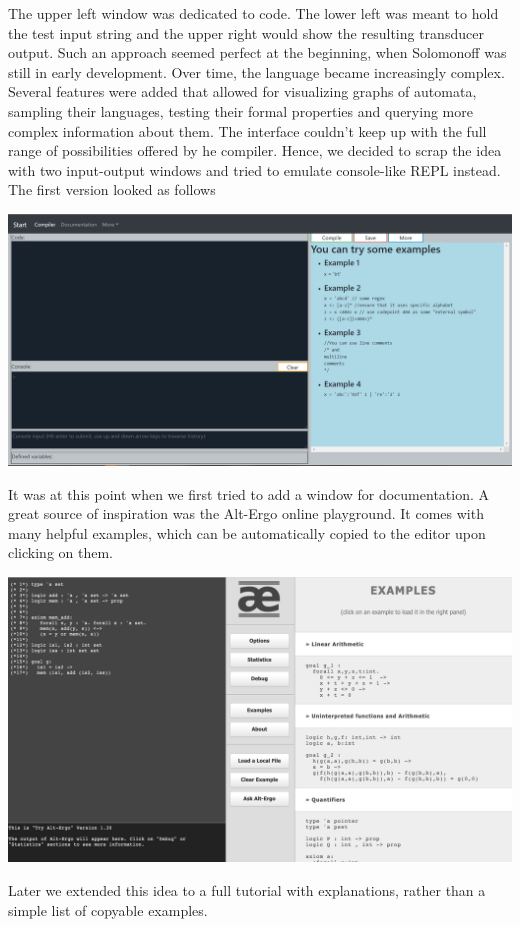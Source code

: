 The upper left window was dedicated to code. The lower left was meant to hold the test input string and the upper right would show the resulting transducer output. Such an approach seemed perfect at the beginning, when Solomonoff was still in early development. Over time, the language became increasingly complex. Several features were added that allowed for visualizing graphs of automata, sampling their languages, testing their formal properties and querying more complex information about them. The interface couldn't keep up with the full range of possibilities offered by he compiler. Hence, we decided to scrap the idea with two input-output windows and tried to emulate console-like REPL instead. The first version looked as follows
\begin{center}
     \includegraphics[scale=0.2]{web6.png}
\end{center}
It was at this point when we first tried to add a window for documentation. A great source of inspiration was the Alt-Ergo online playground. It comes with many helpful examples, which can be automatically copied to the editor upon clicking on them.
\begin{center}
     \includegraphics[scale=0.3]{alt-ergo.png}
\end{center}
Later we extended this idea to a full tutorial with explanations, rather than a simple list of copyable examples. 

